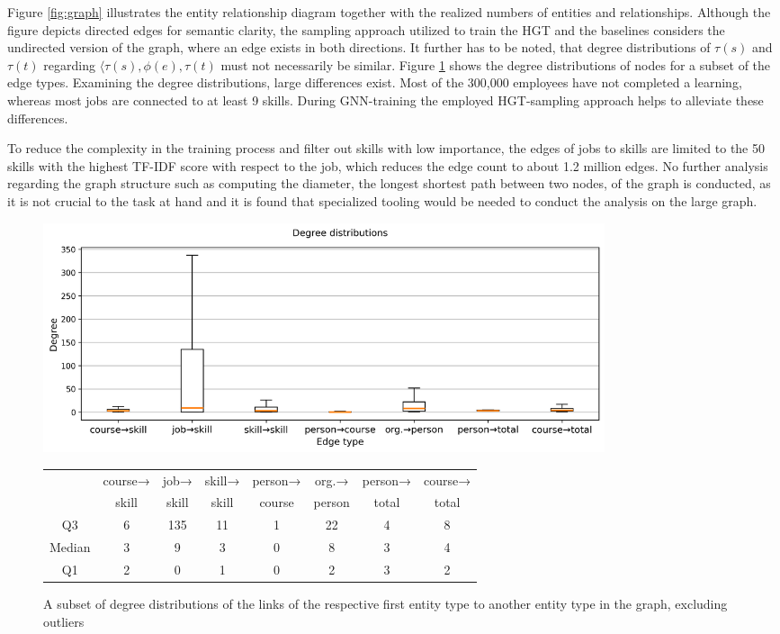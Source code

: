  Figure \ref{fig:graph} illustrates the entity relationship diagram together with the realized numbers of entities and relationships. 
Although the figure depicts directed edges for semantic clarity, the sampling approach utilized to train the HGT and the baselines considers the undirected version of the graph, where an edge exists in both directions. It further has to be noted, that degree distributions of $\tau(s)$ and $\tau(t)$ regarding $\langle \tau(s), \phi(e), \tau(t)$ must not necessarily be similar.  Figure \ref{fig:entities2} shows the degree distributions of nodes for a subset of the edge types. Examining the degree distributions, large differences exist. Most of the 300,000 employees have not completed a learning, whereas most jobs are connected to at least 9 skills. During GNN-training the employed HGT-sampling approach helps to alleviate these differences. 

To reduce the complexity in the training process and filter out skills with low importance, the edges of jobs to skills are limited to the 50 skills with the highest TF-IDF score with respect to the job, which reduces the edge count to about 1.2 million edges. No further analysis regarding the graph structure such as computing the diameter, the longest shortest path between two nodes,  of the graph is conducted, as it is not crucial to the task at hand and it is found that specialized tooling would be needed to conduct the analysis on the large graph. 
\begin{figure}
    \centering
    \includegraphics[width=0.8\textwidth]{img/boxplot_notable_notable.png}

    \setlength\tabcolsep{3pt}

\begin{tabular}{|c|c|c|c|c|c|c|c|}
\hline
 & course→ & job→ &skill→& person→  & org.→  & person→ & course→ \\ 
 & skill & skill & skill&course &person&total&total\\
\hline
  Q3 & 6 &135&11&1&22&4&8 \\ \hline
 Median& 3&9&3&0&8&3&4\\ \hline
 Q1 & 2&0&1&0&2&3&2\\ 


\hline 



\end{tabular}

    \caption[Node degree distributions]{A subset of degree distributions of the links of the respective first entity type to another entity type in the graph, excluding outliers}

    
    \label{fig:entities2}
\end{figure}

